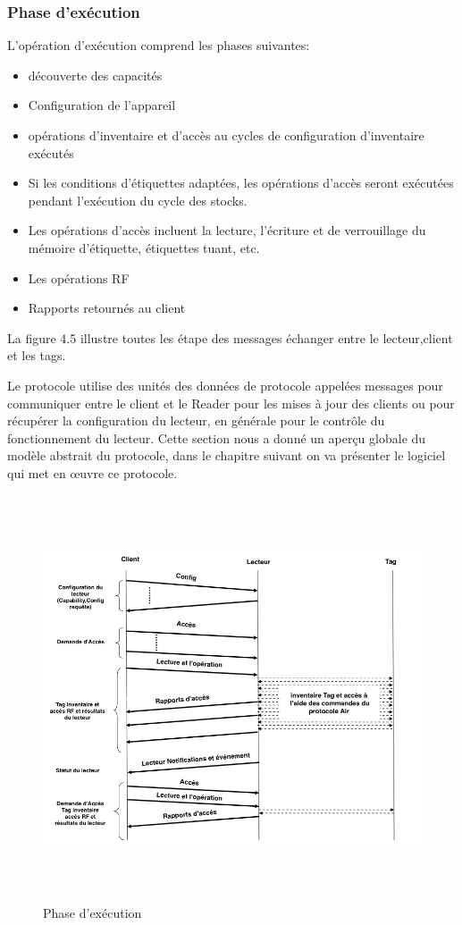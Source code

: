 \documentclass[11pt, a4paper, twoside]{book}
\begin{document}
\subsubsection{Phase d'exécution}
L'opération d'exécution comprend les phases suivantes:
\begin{itemize}
\item découverte des capacités
\item Configuration de l'appareil
\item opérations d'inventaire et d'accès au cycles de configuration d'inventaire exécutés
\item Si les conditions d'étiquettes adaptées, les opérations d'accès seront exécutées pendant l'exécution du cycle des stocks.
\item Les opérations d'accès incluent la lecture, l'écriture et de verrouillage du mémoire d'étiquette, étiquettes tuant, etc.
\item Les opérations RF
\item Rapports retournés au client
\end{itemize}

La figure 4.5 illustre toutes les étape des messages échanger entre le lecteur,client et les tags.

Le protocole utilise des unités des données de protocole appelées messages pour communiquer entre le client et le Reader pour  les mises à jour des clients ou pour récupérer la configuration du lecteur, en générale pour le contrôle du fonctionnement du lecteur. Cette section nous a donné un aperçu globale du modèle abstrait du protocole, dans le chapitre suivant on va présenter le logiciel qui met en œuvre ce protocole.
\begin{figure}[!h]
\centering
\includegraphics[height=12cm]{runtime}
\caption{Phase d'exécution}
\end{figure}
\pagebreak
\end{document}
